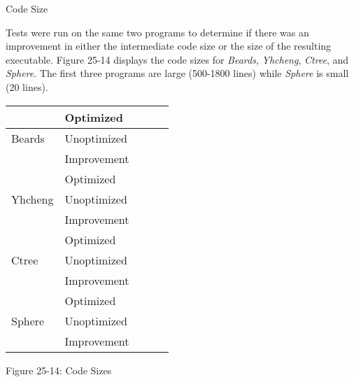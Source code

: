 {\sffamily
Code Size}

Tests were run on the same two programs to determine if there was an
improvement in either the intermediate code size or the size of the
resulting executable. Figure 25-14 displays the code sizes for
\textit{Beards}, \textit{Yhcheng}, \textit{Ctree}, and
\textit{Sphere}. The first three programs are large (500-1800 lines)
while \textit{Sphere} is small (20 lines).

\begin{center}
\tabletail{}
\tablelasttail{}
\begin{supertabular}{|m{1.1212599in}|m{1.1212599in}|m{1.1212599in}|m{1.1212599in}|m{1.1212599in}|}
\hline
~
 &
 Optimized &
 &
 &
\raggedleft{}\\\hline
 Beards &
 Unoptimized &
 &
 &
\raggedleft{}\\\hline
~
 &
 Improvement &
 &
 &
\raggedleft{}\\\hline
~
 &
 Optimized &
 &
 &
\raggedleft{}\\\hline
 Yhcheng &
 Unoptimized &
 &
 &
\raggedleft{}\\\hline
~
 &
 Improvement &
 &
 &
\raggedleft{}\\\hline
~
 &
 Optimized &
 &
 &
\raggedleft{}\\\hline
 Ctree &
 Unoptimized &
 &
 &
\raggedleft{}\\\hline
~
 &
 Improvement &
 &
 &
\raggedleft{}\\\hline
~
 &
 Optimized &
 &
 &
\raggedleft{}\\\hline
 Sphere &
 Unoptimized &
 &
 &
\raggedleft{}\\\hline
~
 &
 Improvement &
 &
 &
\raggedleft{}\\\hline
\end{supertabular}
\end{center}
{\centering{}
Figure 25-14: Code Sizes
\par}



